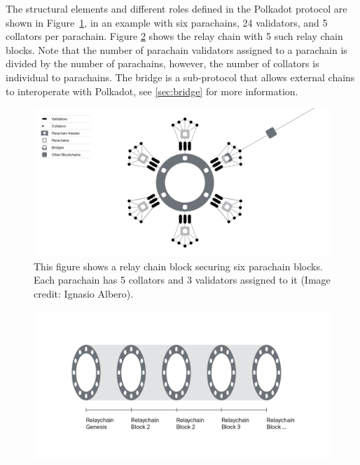 The structural elements and different roles defined in the Polkadot protocol are shown in Figure~\ref{fig:roles}, in an example with six parachains, 24 validators, and 5 collators per parachain. Figure \ref{fig:relaychain} shows the relay chain with 5 such relay chain blocks. Note that the number of parachain validators assigned to a parachain is divided by the number of parachains, however, the number of collators is individual to parachains.  The bridge is a sub-protocol that allows external chains to interoperate with Polkadot, see \ref{sec:bridge} for more information.
\begin{figure}[h]
	\centering
	\includegraphics[width=\textwidth]{images/Network@2x.png}
	\caption{This figure shows a relay chain block securing six parachain blocks. Each parachain has  5 collators and 3 validators assigned to it  (Image credit: Ignasio Albero).}
	\label{fig:roles}
\end{figure}
\begin{figure}[h]
	\centering
	\includegraphics[width=\textwidth]{images/Relaychain.png}
	\caption{}
	\label{fig:relaychain}
\end{figure}

